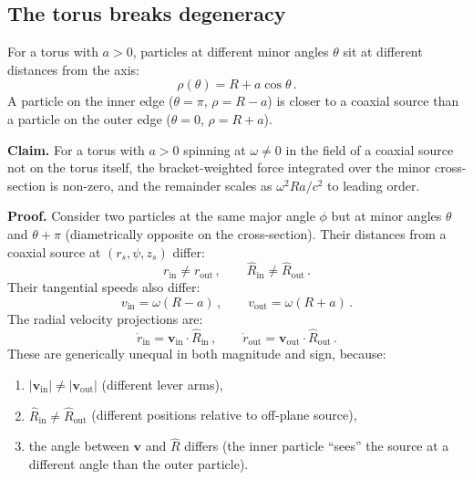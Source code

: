 \documentclass[12pt,preprint,amsmath,amssymb]{revtex4-2}
\begin{document}
\subsection{The torus breaks degeneracy}

For a torus with $a > 0$, particles at different minor angles $\theta$ sit at
different distances from the axis:
\begin{equation}
\rho(\theta) = R + a\cos\theta\,.
\end{equation}
A particle on the inner edge ($\theta = \pi$, $\rho = R - a$) is closer to a
coaxial source than a particle on the outer edge ($\theta = 0$, $\rho = R + a$).

\textbf{Claim.} For a torus with $a > 0$ spinning at $\omega \neq 0$ in the
field of a coaxial source not on the torus itself, the bracket-weighted force
integrated over the minor cross-section is non-zero, and the remainder scales
as $\omega^2 R a / c^2$ to leading order.

\textbf{Proof.} Consider two particles at the same major angle $\phi$ but at
minor angles $\theta$ and $\theta + \pi$ (diametrically opposite on the cross-section).
Their distances from a coaxial source at $(r_s, \psi, z_s)$ differ:
\begin{equation}
r_{\text{in}} \neq r_{\text{out}}\,,\qquad
\hat{R}_{\text{in}} \neq \hat{R}_{\text{out}}\,.
\end{equation}
Their tangential speeds also differ:
\begin{equation}
v_{\text{in}} = \omega(R - a)\,,\qquad v_{\text{out}} = \omega(R + a)\,.
\end{equation}
The radial velocity projections are:
\begin{equation}
\dot{r}_{\text{in}} = \mathbf{v}_{\text{in}} \cdot \hat{R}_{\text{in}}\,,\qquad
\dot{r}_{\text{out}} = \mathbf{v}_{\text{out}} \cdot \hat{R}_{\text{out}}\,.
\end{equation}
These are generically unequal in both magnitude and sign, because:
\begin{enumerate}
\item $|\mathbf{v}_{\text{in}}| \neq |\mathbf{v}_{\text{out}}|$ (different lever arms),
\item $\hat{R}_{\text{in}} \neq \hat{R}_{\text{out}}$ (different positions relative to off-plane source),
\item the angle between $\mathbf{v}$ and $\hat{R}$ differs (the inner particle ``sees'' the source at a different angle than the outer particle).
\end{enumerate}
\end{document}

